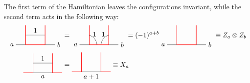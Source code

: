\noindent
The first term of the Hamiltonian leaves the configurations invariant, while the second term acts in the following way:
	\begin{align}
		\begin{tikzpicture}[scale=1,baseline=(current bounding box.center)]
			\draw (-0.5,0) -- (0,0);
			\draw [red, line width=0.25mm] (0,0) -- (1,0);
			\draw (1,0) -- (1.5,0);
			\draw [red, line width=0.25mm] (0,0) -- (0,1);
			\draw (0,0.5) to node[above] {$1$} (1,0.5);
			\draw [red, line width=0.25mm] (1,0) -- (1,1);
			\node at (-0.7,0) {$a$};
			\node at (1.7,0) {$b$};
		\end{tikzpicture}&=
		\begin{tikzpicture}[scale=1,baseline=(current bounding box.center)]
			\draw (-0.5,0) -- (0,0);
			\draw [red, line width=0.25mm] (0,0) -- (1,0);
			\draw (1,0) -- (1.5,0);
			\draw [red, line width=0.25mm] (0,0) -- (0,1);
			\draw [red, line width=0.25mm] (1,0) -- (1,1);
			\node at (-0.7,0) {$a$};
			\node at (1.7,0) {$b$};
			\draw (0,0.5) to[bend left] node[above] {$1$} (0.4,0);
			\draw (1,0.5) to[bend right] node[above] {$1$} (0.6,0);
		\end{tikzpicture}=(-1)^{a+b}
		\begin{tikzpicture}[scale=1,baseline=(current bounding box.center)]
			\draw (-0.5,0) -- (0,0);
			\draw [red, line width=0.25mm] (0,0) -- (1,0);
			\draw (1,0) -- (1.5,0);
			\draw [red, line width=0.25mm] (0,0) -- (0,1);
			\draw [red, line width=0.25mm] (1,0) -- (1,1);
			\node at (-0.7,0) {$a$};
			\node at (1.7,0) {$b$};
		\end{tikzpicture}\equiv Z_a\otimes Z_b\\
		\begin{tikzpicture}[scale=1,baseline=(current bounding box.center)]
			\draw [red, line width=0.25mm] (-0.5,0) -- (0,0);
			\draw (0,0) to node[below] {$a$} (1,0);
			\draw [red, line width=0.25mm] (1,0) -- (1.5,0);
			\draw [red, line width=0.25mm] (0,0) -- (0,1);
			\draw [red, line width=0.25mm] (1,0) -- (1,1);
			\draw (0,0.5) to node[above] {$1$} (1,0.5);
		\end{tikzpicture}&=
		\begin{tikzpicture}[scale=1,baseline=(current bounding box.center)]
			\draw [red, line width=0.25mm] (-0.5,0) -- (0,0);
			\draw (0,0) to node[below] {$a+1$} (1,0);
			\draw [red, line width=0.25mm] (1,0) -- (1.5,0);
			\draw [red, line width=0.25mm] (0,0) -- (0,1);
			\draw [red, line width=0.25mm] (1,0) -- (1,1);
		\end{tikzpicture}\equiv X_a
	\end{align}
